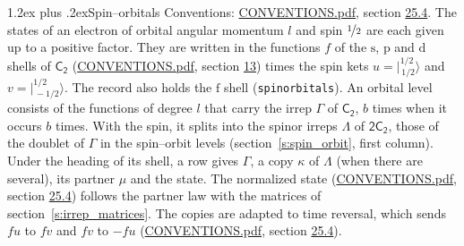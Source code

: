 \documentclass[10pt,a4paper]{article}
\makeatletter
\renewcommand\section{\@startsection{section}{1}{\z@}{-3ex plus -1ex minus -.2ex}%
  {1.2ex plus .2ex}{\normalfont\large\sffamily\bfseries\color{parttitle}}}
\numberwithin{equation}{section}
\newcommand{\grp}[1]{\mathsf{#1}}
\newcommand{\orbital}[1]{\mathrm{#1}}
\newcommand{\mult}{\kappa}
\newcommand{\intx}{\mu}
\newcommand{\jm}[2]{\bigl\lvert{}^{#1}_{\,#2}\bigr\rangle}
\makeatother
\begin{document}
\section{Spin--orbitals}\label{s:spin_orbitals}
Conventions: \href{../../CONVENTIONS.pdf}{CONVENTIONS.pdf}, section \href{../../CONVENTIONS.pdf\#conv.25.4}{25.4}.
\leavevmode\label{n:index.orbital.l}The states of an electron of orbital angular momentum $l$ and spin $\nicefrac{1}{2}$ are each given up to a positive factor. \label{n:local.spinor.uv}\label{n:local.function.f}They are written in the functions $f$ of the $\orbital{s}$, $\orbital{p}$ and $\orbital{d}$ shells of \href{../../../rotation/data/pdf/C2.pdf}{$\grp{C_{2}}$} (\href{../../CONVENTIONS.pdf}{CONVENTIONS.pdf}, section \href{../../../rotation/CONVENTIONS.pdf\#conv.13}{13}) times the spin kets $u = \jm{1/2}{1/2}$ and $v = \jm{1/2}{-1/2}$. The record also holds the $\orbital{f}$ shell (\texttt{spinorbitals}). An orbital level consists of the functions of degree $l$ that carry the irrep $\Gamma$ of \href{../../../rotation/data/pdf/C2.pdf}{$\grp{C_{2}}$}, $b$ times when it occurs $b$ times. With the spin, it splits into the spinor irreps $\Lambda$ of $\grp{2C_{2}}$, those of the doublet of $\Gamma$ in the spin--orbit levels (section~\ref{s:spin_orbit}, first column). \label{n:head.state}Under the heading of its shell, a row gives $\Gamma$, a copy $\mult$ of $\Lambda$ (when there are several), its partner $\intx$ and the state. The normalized state (\href{../../CONVENTIONS.pdf}{CONVENTIONS.pdf}, section \href{../../CONVENTIONS.pdf\#conv.25.4}{25.4}) follows the partner law with the matrices of section~\ref{s:irrep_matrices}. The copies are adapted to time reversal, which sends $f u$ to $f v$ and $f v$ to $-f u$ (\href{../../CONVENTIONS.pdf}{CONVENTIONS.pdf}, section \href{../../CONVENTIONS.pdf\#conv.25.4}{25.4}).
\end{document}
